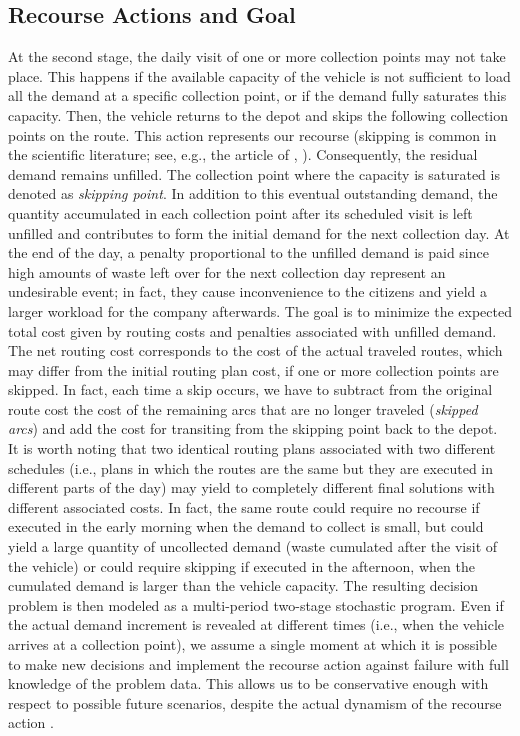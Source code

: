 \documentclass[preprint,11pt,authoryear]{elsarticle}
\newcommand{\rev}[1]{\textcolor{blue}{{#1}}}
\begin{document}
\subsection{Recourse Actions and Goal}
At the second stage, the daily visit of one or more collection points may not take place. This happens 
if the available capacity of the vehicle is not sufficient to load all the demand at a specific collection point, or if the demand fully saturates this capacity. Then, the vehicle returns to the depot and skips the following collection points on the route. This action represents our recourse (skipping is common in the scientific literature; see, e.g., the article of \citeauthor{Beraldi2010}, \citeyear{Beraldi2010}).
Consequently, the residual demand remains unfilled. The collection point where the capacity is saturated is denoted as \textit{skipping point}.
In addition to this eventual outstanding demand, the quantity accumulated in each collection point after its scheduled visit is left unfilled and contributes to form the initial demand for the next collection day.
At the end of the day, a penalty proportional to the unfilled demand is paid since high amounts of waste left over for the next collection day represent an undesirable event; in fact, they cause inconvenience to the citizens and yield a larger workload for the company afterwards.
The goal is to minimize the expected total cost given by routing costs and penalties associated with unfilled demand.
The net routing cost corresponds to the cost of the actual traveled routes, which may differ from the initial routing plan cost, if one or more collection points are skipped. In fact, each time a skip occurs, we have to subtract from the original route cost the cost of the remaining arcs that are no longer traveled (\textit{skipped arcs}) and add the cost for transiting from the skipping point back to the depot.
It is worth noting that two identical routing plans associated with two different schedules (i.e., plans in which the routes are the same but they are executed in different parts of the day) may yield to completely different final solutions with different associated costs.
In fact, the same route could require no recourse if executed in the early morning when the demand to collect is small, but could yield a large quantity of uncollected demand (waste cumulated after the visit of the vehicle) or could require skipping if executed in the afternoon, when the cumulated demand is larger than the vehicle capacity.
The resulting decision problem is then modeled as a multi-period two-stage stochastic program. Even if the actual demand increment is revealed at different times
(i.e., when the vehicle arrives at a collection point), we assume a single moment at which it is possible
to make new decisions and implement the recourse action against failure with full knowledge of the problem data. This allows us to be conservative enough with respect to possible future scenarios, despite the actual dynamism of the recourse action \citep{Gobbi2026}.
\end{document}
